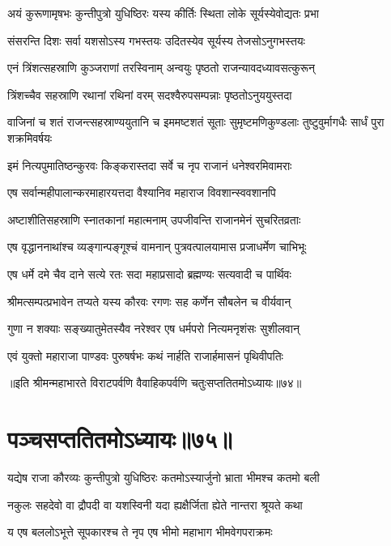 \twolineshloka
{अयं कुरूणामृषभः कुन्तीपुत्रो युधिष्ठिरः}
{यस्य कीर्तिः स्थिता लोके सूर्यस्येवोद्यतः प्रभा}


\twolineshloka
{संसरन्ति दिशः सर्वा यशसोऽस्य गभस्तयः}
{उदितस्येव सूर्यस्य तेजसोऽनुगभस्तयः}


\twolineshloka
{एनं त्रिंशत्सहस्राणि कुञ्जराणां तरस्विनाम्}
{अन्वयुः पृष्ठतो राजन्यावदध्यावसत्कुरून्}


\twolineshloka
{त्रिंशच्चैव सहस्राणि रथानां रथिनां वरम्}
{सदश्वैरुपसम्पन्नाः पृष्ठतोऽनुययुस्तदा}


\threelineshloka
{वाजिनां च शतं राजन्त्सहस्राण्ययुतानि च}
{इममष्टशतं सूताः सुमृष्टमणिकुण्डलाः}
{तुष्टुवुर्मागधैः सार्धं पुरा शक्रमिवर्षयः}


\twolineshloka
{इमं नित्यपुमातिष्ठन्कुरवः किङ्करास्तदा}
{सर्वे च नृप राजानं धनेश्वरमिवामराः}


\twolineshloka
{एष सर्वान्महीपालान्करमाहारयत्तदा}
{वैश्यानिव महाराज विवशान्स्ववशानपि}


\twolineshloka
{अष्टाशीतिसहस्राणि स्नातकानां महात्मनाम्}
{उपजीवन्ति राजानमेनं सुचरितव्रताः}


\twolineshloka
{एष वृद्धाननाथांश्च व्यङ्गान्पङ्गूश्चं वामनान्}
{पुत्रवत्पालयामास प्रजाधर्मेण चाभिभूः}


\twolineshloka
{एष धर्मे दमे चैव दाने सत्ये रतः सदा}
{महाप्रसादो ब्रह्मण्यः सत्यवादी च पार्थिवः}


\twolineshloka
{श्रीमत्सम्पत्प्रभावेन तप्यते यस्य कौरवः}
{रगणः सह कर्णेन सौबलेन च वीर्यवान्}


\twolineshloka
{गुणा न शक्याः सङ्ख्यातुमेतस्यैव नरेश्वर}
{एष धर्मपरो नित्यमनृशंसः सुशीलवान्}


\twolineshloka
{एवं युक्तो महाराजा पाण्डवः पुरुषर्षभः}
{कथं नार्हति राजार्हमासनं पृथिवीपतिः}

॥इति श्रीमन्महाभारते विराटपर्वणि वैवाहिकपर्वणि चतुःसप्ततितमोऽध्यायः॥७४॥

\chapter{पञ्चसप्ततितमोऽध्यायः॥७५॥}

\twolineshloka
{यद्येष राजा कौरव्यः कुन्तीपुत्रो युधिष्ठिरः}
{कतमोऽस्यार्जुनो भ्राता भीमश्च कतमो बली}


\twolineshloka
{नकुलः सहदेवो वा द्रौपदी वा यशस्विनी}
{यदा ह्यक्षैर्जिता ह्येते नान्तरा श्रूयते कथा}




\twolineshloka
{य एष बललोऽभूत्ते सूपकारश्च ते नृप}
{एष भीमो महाभाग भीमवेगपराक्रमः}



